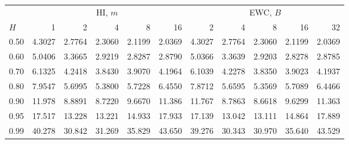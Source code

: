 \begin{tabular}{@{}lrrrrrrrrrr@{}}\toprule
 & \multicolumn{5}{c}{HI, $m$} & \multicolumn{5}{c}{EWC, $B$}\\\cmidrule(lr){2-6}\cmidrule(l){7-11}
$H$ & 1 & 2 & 4 & 8 & 16 & 2 & 4 & 8 & 16 & 32\\\midrule
0.50 & 4.3027 & 2.7764 & 2.3060 & 2.1199 & 2.0369 & 4.3027 & 2.7764 & 2.3060 & 2.1199 & 2.0369\\
0.60 & 5.0406 & 3.3665 & 2.9219 & 2.8287 & 2.8790 & 5.0366 & 3.3639 & 2.9203 & 2.8278 & 2.8785\\
0.70 & 6.1325 & 4.2418 & 3.8430 & 3.9070 & 4.1964 & 6.1039 & 4.2278 & 3.8350 & 3.9023 & 4.1937\\
0.80 & 7.9547 & 5.6995 & 5.3800 & 5.7228 & 6.4550 & 7.8712 & 5.6595 & 5.3569 & 5.7089 & 6.4466\\
0.90 & 11.978 & 8.8891 & 8.7220 & 9.6670 & 11.386 & 11.767 & 8.7863 & 8.6618 & 9.6299 & 11.363\\
0.95 & 17.517 & 13.228 & 13.221 & 14.933 & 17.933 & 17.139 & 13.042 & 13.111 & 14.864 & 17.889\\
0.99 & 40.278 & 30.842 & 31.269 & 35.829 & 43.650 & 39.276 & 30.343 & 30.970 & 35.640 & 43.529\\
\bottomrule\end{tabular}
